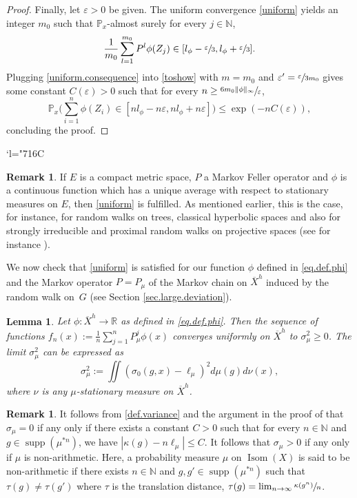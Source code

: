 \documentclass[JEP,XML,SOM,Unicode,published]{cedram}
\newcommand{\Changelback}{\mathcode`l="716C}
\let\epsilon\varepsilon
\let\ts\textstyle
\theoremstyle{plain}
\newtheorem{lemma}[theorem]{Lemma}
\theoremstyle{definition}
\newtheorem{remark}[theorem]{Remark}
\newcommand\R{\mathbb{R}}
\newcommand\p{\mathbb{P}}
\newcommand\N{\mathbb{N}}
\DeclareMathOperator\Isom{Isom}
\DeclareMathOperator\supp{supp}
\begin{document}
\begin{proof}
Finally, let $\epsilon>0$ be given. The uniform convergence \eqref{uniform} yields an integer $m_0$ such that $\p_x$-almost surely for every $j\in\N$,
\begin{equation}\label{uniform.consequence}\frac{1}{m_0}\sum_{l=1}^{m_0} {P^l\phi(Z_{j})}\in [l_{\phi}-\sfrac{\epsilon}{3}, l_{\phi}+\sfrac{\epsilon}{3}].\end{equation}
Plugging \eqref{uniform.consequence} into \eqref{toshow} with $m=m_0$ and
$\epsilon'=\sfrac{\epsilon}{3m_0}$ gives some constant $C(\epsilon)>0$ such that for every $n\geq \sfrac{6m_0 \|\phi\|_{\infty}}{\epsilon}$,
\[
\p_x \bigl(\ts
\sum_{i=1}^n\phi(Z_i) \in [nl_{\phi} - n\epsilon , nl_{\phi} +n\epsilon] \bigr)\leq \exp(-n C(\epsilon)),
\]
concluding the proof.
\end{proof}
\Changelback

\begin{remark}
If $E$ is a compact metric space, $P$ a Markov Feller operator and $\phi$ is a continuous function which has a unique average with respect to stationary measures on $E$, then \eqref{uniform} is fulfilled. As mentioned earlier, this is the case, for instance, for random walks on trees, classical hyperbolic spaces and also for strongly irreducible and proximal random walks on projective spaces (see for instance \cite{BQ.book}).
\end{remark}

We now check that \eqref{uniform} is satisfied for our function $\phi$ defined in \eqref{eq.def.phi} and the Markov operator $P=P_\mu$ of the Markov chain on $\overline{X}^h$ induced by the random walk on~$G$ (see Section \ref{sec.large.deviation}).

\begin{lemma}\label{lemma.unif.conv}
Let $\phi:\overline{X}^h \to \R$ as defined in \eqref{eq.def.phi}. Then the sequence of functions $f_n(x):=\frac{1}{n}\sum_{j=1}^n{P^j_\mu \phi(x)}$ converges uniformly on $\overline{X}^h$ to $\sigma^2_\mu\geq 0$. The limit $\sigma_{\mu}^2$ can be expressed as
\begin{equation}\label{def.variance}\sigma_{\mu}^2:=\iint{(\sigma_0(g,x)-\ell_{\mu})^2 d\mu(g) d\nu(x)},
\end{equation}
where $\nu$ is any $\mu$-stationary measure on $\overline{X}^h$.
\end{lemma}

\begin{remark}\label{rk.sigma.positive}
It follows from \eqref{def.variance} and the argument in the proof of \cite[Th.\,4.7.b]{BQ.hyperbolic} that $\sigma_\mu=0$ if any only if there exists a constant $C>0$ such that for every $n \in \N$ and $g\in \supp(\mu^{\ast n})$, we have $|\kappa(g)-n\ell_{\mu}|\leq C$. It follows that $\sigma_\mu>0$ if any only if $\mu$ is non-arithmetic.
Here, a probability measure $\mu$ on $\Isom(X)$ is said to be non-arithmetic if there exists $n \in \N$ and $g,g' \in \supp(\mu^{\ast n})$ such that $\tau(g) \neq \tau(g')$ where $\tau$ is the translation distance, $\tau(g)=\lim_{n \to \infty}\sfrac{\kappa(g^n)}{n}$.
\end{remark}
\end{document}
